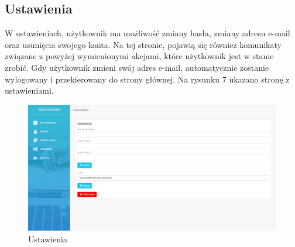 \documentclass[12pt, titlepage]{article}
\begin{document}
	\subsection{Ustawienia}
	W ustawieniach, użytkownik ma możliwość zmiany hasła, zmiany adresu e-mail oraz usunięcia swojego konta. Na tej stronie, pojawią się również komunikaty związane z powyżej wymienionymi akcjami, które użytkownik jest w stanie zrobić. Gdy użytkownik zmieni swój adres e-mail, automatycznie zostanie wylogowany i przekierowany do strony głównej. Na rysunku 7 ukazano stronę z ustawieniami.
	\begin{figure}[H]
		\centering
		\includegraphics[scale=0.45]{obrazki/ustawienia.png}
		\caption{Ustawienia}
		\label{fig:db_schema}
	\end{figure}
	
\end{document}
